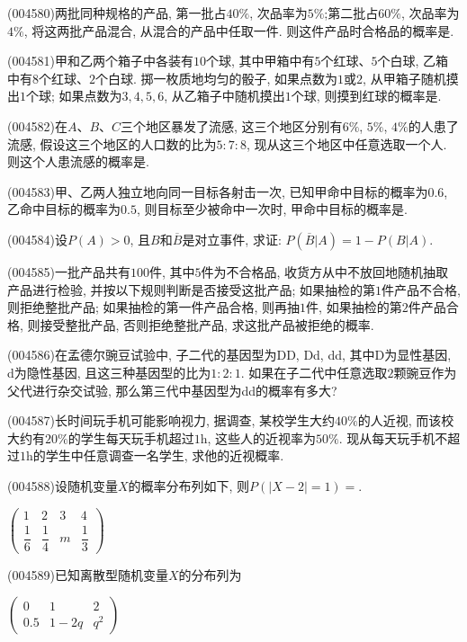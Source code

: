 \item (004580)两批同种规格的产品, 第一批占$40\%$, 次品率为$5\%$;第二批占$60\%$, 次品率为$4\%$, 将这两批产品混合, 从混合的产品中任取一件. 则这件产品时合格品的概率是.
\item (004581)甲和乙两个箱子中各装有$10$个球, 其中甲箱中有$5$个红球、$5$个白球, 乙箱中有$8$个红球、$2$个白球. 掷一枚质地均匀的骰子, 如果点数为$1$或$2$, 从甲箱子随机摸出$1$个球; 如果点数为$3, 4, 5, 6$, 从乙箱子中随机摸出$1$个球, 则摸到红球的概率是.
\item (004582)在$A$、$B$、$C$三个地区暴发了流感, 这三个地区分别有$6\%$, $5\%$, $4\%$的人患了流感, 假设这三个地区的人口数的比为$5: 7: 8$, 现从这三个地区中任意选取一个人. 则这个人患流感的概率是.
\item (004583)甲、乙两人独立地向同一目标各射击一次, 已知甲命中目标的概率为$0.6$, 乙命中目标的概率为$0.5$, 则目标至少被命中一次时, 甲命中目标的概率是.
\item (004584)设$P(A)>0$, 且$B$和$\overline B$是对立事件, 求证: $P(\overline B|A)=1-P(B|A)$.
\item (004585)一批产品共有$100$件, 其中$5$件为不合格品, 收货方从中不放回地随机抽取产品进行检验, 并按以下规则判断是否接受这批产品; 如果抽检的第$1$件产品不合格, 则拒绝整批产品; 如果抽检的第一件产品合格, 则再抽$1$件, 如果抽检的第$2$件产品合格, 则接受整批产品, 否则拒绝整批产品, 求这批产品被拒绝的概率.
\item (004586)在孟德尔豌豆试验中, 子二代的基因型为DD, Dd, dd, 其中D为显性基因, d为隐性基因, 且这三种基因型的比为$1: 2: 1$. 如果在子二代中任意选取$2$颗豌豆作为父代进行杂交试验, 那么第三代中基因型为dd的概率有多大?
\item (004587)长时间玩手机可能影响视力, 据调查, 某校学生大约$40\%$的人近视, 而该校大约有$20\%$的学生每天玩手机超过$1\text{h}$, 这些人的近视率为$50\%$. 现从每天玩手机不超过$1\text{h}$的学生中任意调查一名学生, 求他的近视概率.
\item (004588)设随机变量$X$的概率分布列如下, 则$P(|X-2|=1)=$.
\begin{center}
    $\begin{pmatrix}
        1 & 2 & 3 & 4\\ 
        \dfrac 16 & \dfrac 14 & m & \dfrac 13      
    \end{pmatrix}$
\end{center}
\item (004589)已知离散型随机变量$X$的分布列为
\begin{center}
    $\begin{pmatrix}
        0 & 1 & 2 \\ 
        0.5 & 1-2q & q^2 
    \end{pmatrix}$
\end{center}
